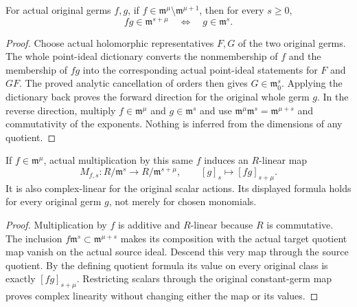 \begin{lemma}
\label{hir:actual-principal-maximal-power-cancellation}
\leanok
{}
For actual original germs $f,g$, if
$f\in\mathfrak m^\mu\setminus\mathfrak m^{\mu+1}$, then for every
$s\ge0$,
\[
 fg\in\mathfrak m^{s+\mu}\quad\Longleftrightarrow\quad
 g\in\mathfrak m^s.
\]
\end{lemma}
\begin{proof}
Choose actual holomorphic representatives $F,G$ of the two original germs.
The whole point-ideal dictionary converts the nonmembership of $f$ and
the membership of $fg$ into the corresponding actual point-ideal statements
for $F$ and $GF$. The proved analytic cancellation of orders then gives
$G\in\mathfrak m_0^s$. Applying the dictionary back proves the forward
direction for the original whole germ $g$. In the reverse direction,
multiply $f\in\mathfrak m^\mu$ and $g\in\mathfrak m^s$ and use
$\mathfrak m^\mu\mathfrak m^s=\mathfrak m^{\mu+s}$ and commutativity
of the exponents. Nothing is inferred from the dimensions of any quotient.
\end{proof}

\begin{theorem}
\label{hir:actual-principal-multiplication-jet-map}
\leanok
{}
If $f\in\mathfrak m^\mu$, actual multiplication by this same $f$ induces
an $R$-linear map
\[
 M_{f,s}:R/\mathfrak m^s\longrightarrow R/\mathfrak m^{s+\mu},
 \qquad [g]_s\longmapsto[fg]_{s+\mu}.
\]
It is also complex-linear for the original scalar actions. Its displayed
formula holds for every original germ $g$, not merely for chosen monomials.
\end{theorem}
\begin{proof}
Multiplication by $f$ is additive and $R$-linear because $R$ is commutative.
The inclusion $f\mathfrak m^s\subset\mathfrak m^{\mu+s}$ makes its
composition with the actual target quotient map vanish on the actual
source ideal. Descend this very map through the source quotient. By the
defining quotient formula its value on every original class is exactly
$[fg]_{s+\mu}$. Restricting scalars through the original constant-germ map
proves complex linearity without changing either the map or its values.
\end{proof}


